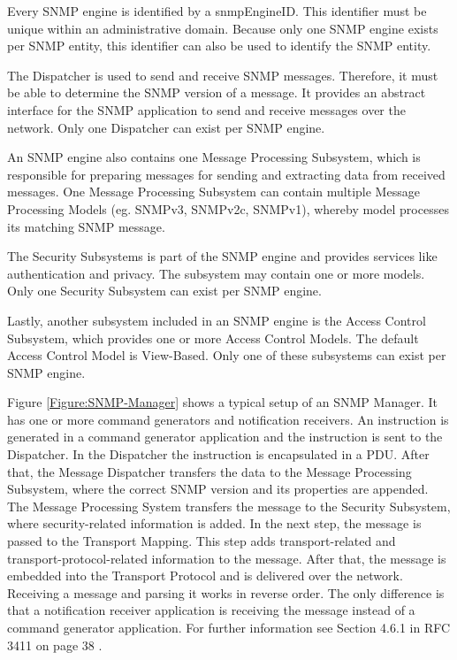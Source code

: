 Every SNMP engine is identified by a snmpEngineID. This identifier must be unique within an administrative domain. Because only one SNMP engine exists per SNMP entity, this identifier can also be used to identify the SNMP entity.

\newpage
The Dispatcher is used to send and receive SNMP messages. Therefore, it must be able to determine the SNMP version of a message. It provides an abstract interface for the SNMP application to send and receive messages over the network. Only one Dispatcher can exist per SNMP engine.

An SNMP engine also contains one Message Processing Subsystem, which is responsible for preparing messages for sending and extracting data from received messages. One Message Processing Subsystem can contain multiple Message Processing Models (eg. SNMPv3, SNMPv2c, SNMPv1), whereby model processes its matching SNMP message.

The Security Subsystems is part of the SNMP engine and provides services like authentication and privacy. The subsystem may contain one or more models. Only one Security Subsystem can exist per SNMP engine.

Lastly, another subsystem included in an SNMP engine is the Access Control Subsystem, which provides one or more Access Control Models. The default Access Control Model is View-Based. Only one of these subsystems can exist per SNMP engine.

Figure \ref{Figure:SNMP-Manager} shows a typical setup of an SNMP Manager. It has one or more command generators and notification receivers. An instruction is generated in a command generator application and the instruction is sent to the Dispatcher. In the Dispatcher the instruction is encapsulated in a PDU. After that, the Message Dispatcher transfers the data to the Message Processing Subsystem, where the correct SNMP version and its properties are appended. The Message Processing System transfers the message to the Security Subsystem, where security-related information is added. In the next step, the message is passed to the Transport Mapping. This step adds transport-related and transport-protocol-related information to the message. After that, the message is embedded into the Transport Protocol and is delivered over the network. Receiving a message and parsing it works in reverse order. The only difference is that a notification receiver application is receiving the message instead of a command generator application. For further information see Section 4.6.1 in RFC 3411 on page 38 \cite{RFC:RFC3411:2002}.

